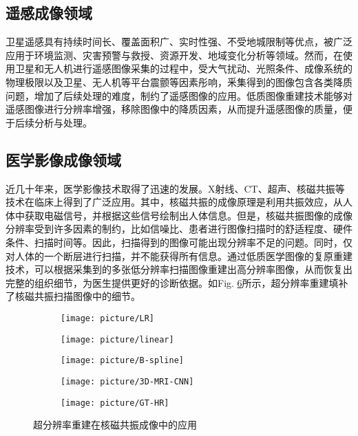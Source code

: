 \documentclass[letterpaper,10pt]{article}
\begin{document}
		\subsection{遥感成像领域}
		
		卫星遥感具有持续时间长、覆盖面积广、实时性强、不受地城限制等优点，被广泛应用于环境监测、灾害预警与救授、资源开发、地域变化分析等领域。然而，在使用卫星和无人机进行遥感图像采集的过程中，受大气扰动、光照条件、成像系统的物理极限以及卫星、无人机等平台震颤等因素彤响，釆集得到的图像包含各类降质问题，增加了后续处理的难度，制约了遥感图像的应用。低质图像重建技术能够对遥感图像进行分辨率增强，移除图像中的降质因素，从而提升遥感图像的质量，便于后续分析与处理。
		
		\subsection{医学影像成像领域}
		
		近几十年来，医学影像技术取得了迅速的发展。X射线、CT、超声、核磁共振等技术在临床上得到了广泛应用。其中，核磁共振的成像原理是利用共振效应，从人体中获取电磁信号，并根据这些信号绘制出人体信息。但是，核磁共振图像的成像分辨率受到许多因素的制约，比如信噪比、患者进行图像扫描时的舒适程度、硬件条件、扫描时间等。因此，扫描得到的图像可能出现分辨率不足的问题。同时，仅对人体的一个断层进行扫描，并不能获得所有信息。通过低质医学图像的复原重建技术，可以根据采集到的多张低分辨率扫描图像重建出高分辨率图像，从而恢复出完整的组织细节，为医生提供更好的诊断依据。如Fig. \ref{fig: Super resolution reconstruction}所示，超分辨率重建填补了核磁共振扫描图像中的细节。
	
	    \begin{figure}[htbp] 
		\centering 
		
		\begin{subfigure}{0.15\textwidth}
			\texttt{[image: picture/LR]}
			\captionsetup{font=scriptsize}
			\label{fig:LR input}
		\end{subfigure}
		\begin{subfigure}{0.15\textwidth}
			\texttt{[image: picture/linear]}
			\captionsetup{font=scriptsize}
			\label{fig: Linear}
		\end{subfigure}
		\begin{subfigure}{0.15\textwidth}
			\texttt{[image: picture/B-spline]}
			\captionsetup{font=scriptsize}
			\label{fig: B-spline}	
		\end{subfigure}
		\begin{subfigure}{0.15\textwidth}
			\texttt{[image: picture/3D-MRI-CNN]}
			\captionsetup{font=scriptsize}
			\label{fig: 3D MRI CNN}
		\end{subfigure}
		\begin{subfigure}{0.15\textwidth}
			\texttt{[image: picture/GT-HR]}
			\captionsetup{font=scriptsize}
			\label{fig: GT HR}
		\end{subfigure}
		\captionsetup{font=scriptsize}
		\caption{
			\label{fig: Super resolution reconstruction}
			超分辨率重建在核磁共振成像中的应用 \cite{McDonagh_2017}
		}
	    \end{figure}
	
\end{document}
